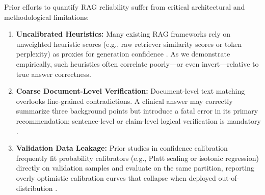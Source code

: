 \documentclass[journal,10pt]{IEEEtran}
\begin{document}
Prior efforts to quantify RAG reliability suffer from critical architectural and methodological limitations:
\begin{enumerate}
    \item \textbf{Uncalibrated Heuristics:} Many existing RAG frameworks rely on unweighted heuristic scores (e.g., raw retriever similarity scores or token perplexity) as proxies for generation confidence \cite{kadavath2022language}. As we demonstrate empirically, such heuristics often correlate poorly---or even invert---relative to true answer correctness.
    \item \textbf{Coarse Document-Level Verification:} Document-level text matching overlooks fine-grained contradictions. A clinical answer may correctly summarize three background points but introduce a fatal error in its primary recommendation; sentence-level or claim-level logical verification is mandatory \cite{min2023factscore}.
    \item \textbf{Validation Data Leakage:} Prior studies in confidence calibration frequently fit probability calibrators (e.g., Platt scaling or isotonic regression) directly on validation samples and evaluate on the same partition, reporting overly optimistic calibration curves that collapse when deployed out-of-distribution \cite{niculescu2005predicting}.
\end{enumerate}
\end{document}
